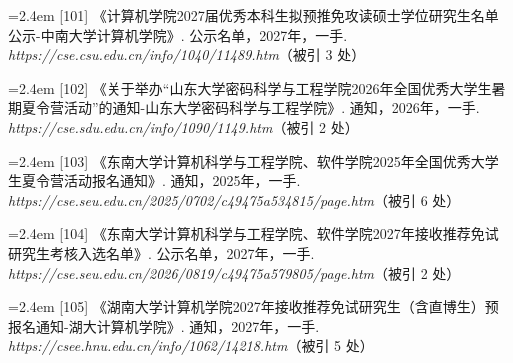 {\vspace{0.6pt}
\vspace{3.5pt}\par
\nopagebreak\vspace{1pt}
\noindent\hangindent=2.4em \label{src:S0124}{\color{cAccent}[101]} 《计算机学院2027届优秀本科生拟预推免攻读硕士学位研究生名单公示-中南大学计算机学院》. 公示名单，2027年，一手. \textit{https://cse.csu.edu.cn/info/1040/11489.htm}（被引 3 处）\par
\vspace{0.6pt}
\vspace{3.5pt}\par
\nopagebreak\vspace{1pt}
\noindent\hangindent=2.4em \label{src:S0125}{\color{cAccent}[102]} 《关于举办“山东大学密码科学与工程学院2026年全国优秀大学生暑期夏令营活动”的通知-山东大学密码科学与工程学院》. 通知，2026年，一手. \textit{https://cse.sdu.edu.cn/info/1090/1149.htm}（被引 2 处）\par
\vspace{0.6pt}
\vspace{3.5pt}\par
\nopagebreak\vspace{1pt}
\noindent\hangindent=2.4em \label{src:S0126}{\color{cAccent}[103]} 《东南大学计算机科学与工程学院、软件学院2025年全国优秀大学生夏令营活动报名通知》. 通知，2025年，一手. \textit{https://cse.seu.edu.cn/2025/0702/c49475a534815/page.htm}（被引 6 处）\par
\vspace{0.6pt}
\noindent\hangindent=2.4em \label{src:S0127}{\color{cAccent}[104]} 《东南大学计算机科学与工程学院、软件学院2027年接收推荐免试研究生考核入选名单》. 公示名单，2027年，一手. \textit{https://cse.seu.edu.cn/2026/0819/c49475a579805/page.htm}（被引 2 处）\par
\vspace{0.6pt}
\vspace{3.5pt}\par
\nopagebreak\vspace{1pt}
\noindent\hangindent=2.4em \label{src:S0129}{\color{cAccent}[105]} 《湖南大学计算机学院2027年接收推荐免试研究生（含直博生）预报名通知-湖大计算机学院》. 通知，2027年，一手. \textit{https://csee.hnu.edu.cn/info/1062/14218.htm}（被引 5 处）\par
}

